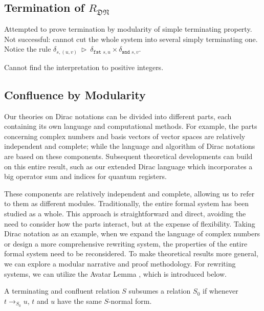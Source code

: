 \documentclass[manuscript, review, timestamp]{acmart}
\newcommand*{\fst}{\texttt{fst }}
\newcommand*{\snd}{\texttt{snd }}
\newcommand*{\reduce}{\ \triangleright\ }
\begin{document}
\subsection{Termination of $R_\mathfrak{DN}$}

Attempted to prove termination by modularity of simple terminating property. Not successful: cannot cut the whole system into several simply terminating one. Notice the rule $\delta_{s, (u, v)} \reduce \delta_{\fst s, u} \times \delta_{\snd s, v}$.

Cannot find the interpretation to positive integers.



\subsection{Confluence by Modularity}
\label{sec: conf-modular}

Our theories on Dirac notations can be divided into different parts, each containing its own language and computational methods. For example, the parts concerning complex numbers and basis vectors of vector spaces are relatively independent and complete; while the language and algorithm of Dirac notations are based on these components. Subsequent theoretical developments can build on this entire result, such as our extended Dirac language which incorporates a big operator sum and indices for quantum registers.

These components are relatively independent and complete, allowing us to refer to them as different modules. Traditionally, the entire formal system has been studied as a whole. This approach is straightforward and direct, avoiding the need to consider how the parts interact, but at the expense of flexibility. Taking Dirac notation as an example, when we expand the language of complex numbers or design a more comprehensive rewriting system, the properties of the entire formal system need to be reconsidered. 
To make theoretical results more general, we can explore a modular narrative and proof methodology. For rewriting systems, we can utilize the Avatar Lemma \cite{Arrighi2005}\cite{Arrighi2017}, which is introduced below.



\begin{definition}[Subsumption]
  A terminating and confluent relation $S$ subsumes a relation $S_0$ if whenever $t \to_{S_0} u$, $t$ and $u$ have the same $S$-normal form.
\end{definition}
\end{document}
